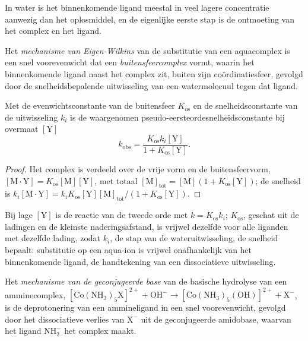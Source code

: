 In water is het binnenkomende ligand meestal in veel lagere concentratie
aanwezig dan het oplosmiddel, en de eigenlijke eerste stap is de
ontmoeting van het complex en het ligand.

\begin{definition}\label{def:b3:complex-mechanisms:eigen-wilkins}
Het \emph{mechanisme van Eigen-Wilkins} van
de substitutie van een aquacomplex is een snel voorevenwicht dat een
\emph{buitensfeercomplex} vormt, waarin het
binnenkomende ligand naast het complex zit, buiten zijn
coördinatiesfeer, gevolgd door de snelheidsbepalende uitwisseling van een
watermolecuul tegen dat ligand.
\end{definition}

\begin{theorem}\label{thm:b3:complex-mechanisms:eigen-wilkins}
Met de evenwichtsconstante van de buitensfeer $K_{\mathrm{os}}$ en de snelheidsconstante van de uitwisseling
$k_i$ is de waargenomen pseudo-eersteordesnelheidsconstante bij overmaat $[\mathrm Y]$
\[
  k_{\mathrm{obs}} = \frac{K_{\mathrm{os}}k_i[\mathrm Y]}{1 + K_{\mathrm{os}}[\mathrm Y]} .
\]
\end{theorem}

\begin{proof}
Het complex is verdeeld over de vrije vorm en de buitensfeervorm, $[\mathrm{M\cdot Y}] = K_{\mathrm{os}}[\mathrm M][\mathrm Y]$,
met totaal $[\mathrm M]_{\mathrm{tot}} = [\mathrm M](1 + K_{\mathrm{os}}[\mathrm Y])$; de snelheid is $k_i[\mathrm{M\cdot Y}] = k_iK_{\mathrm{os}}[\mathrm Y][\mathrm M]_{\mathrm{tot}}/(1 + K_{\mathrm{os}}[\mathrm Y])$.
\end{proof}

Bij lage $[\mathrm Y]$ is de reactie van de tweede orde met $k = K_{\mathrm{os}}k_i$; $K_{\mathrm{os}}$, geschat uit de
ladingen en de kleinste naderingsafstand, is vrijwel dezelfde voor alle
liganden met dezelfde lading, zodat $k_i$, de stap van de wateruitwisseling, de
snelheid bepaalt: substitutie op een aqua-ion is vrijwel onafhankelijk
van het binnenkomende ligand, de handtekening van een dissociatieve
uitwisseling.

\begin{definition}\label{def:b3:complex-mechanisms:conjugate-base}
Het \emph{mechanisme van de geconjugeerde base}
van de basische hydrolyse van een amminecomplex, $\mathrm{[Co(NH_3)_5X]^{2+} + OH^- \to [Co(NH_3)_5(OH)]^{2+} + X^-}$, is
de deprotonering van een ammineligand in een snel voorevenwicht, gevolgd
door het dissociatieve verlies van $\mathrm X^-$ uit de geconjugeerde amidobase, waarvan het ligand $\mathrm{NH_2^-}$
het complex  maakt.
\end{definition}

